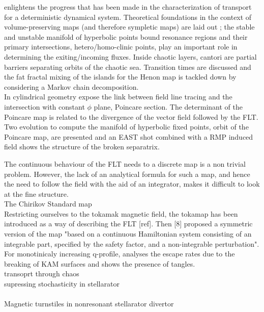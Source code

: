 \cite{meiss_thirty_2015} enlightens the progress that has been made in the characterization of transport for a deterministic dynamical system. Theoretical foundations in the context of volume-preserving maps (and therefore sympletic maps) are laid out ; the stable and unstable manifold of hyperbolic points bound resonance regions and their primary intersections, hetero/homo-clinic points, play an important role in determining the exiting/incoming fluxes. Inside chaotic layers, cantori are partial barriers separating orbits of the chaotic sea. Transition times are discussed and the fat fractal mixing of the islands for the Henon map is tackled down by considering a Markov chain decomposition.
\\[10pt]
In cylindrical geometry \cite{wei_invariant_2023} expose the link between field line tracing and the intersection with constant $\phi$ plane, Poincare section. The determinant of the Poincare map is related to the divergence of the vector field followed by the FLT. Two evolution to compute the manifold of hyperbolic fixed points, orbit of the Poincare map, are presented and an EAST shot combined with a RMP induced field shows the structure of the broken separatrix.

The continuous behaviour of the FLT needs to a discrete map is a non trivial problem.
However, the lack of an analytical formula for such a map, and hence the need to follow the field with the aid of an integrator, makes it difficult to look at the fine structure.
\\[10pt]
The Chirikov Standard map  
\\[10pt]
Restricting ourselves to the tokamak magnetic field, the tokamap has been introduced as a way of describing the FLT [ref]. Then [8] proposed a symmetric version of the map "based on a continuous Hamiltonian system consisting of an integrable part, specified by the safety factor, and a non-integrable perturbation". For monotinicaly increasing q-profile, \cite{wingen_stochastic_2005} analyses the escape rates due to the breaking of KAM surfaces and shows the presence of tangles. 
\\[10pt]
transoprt through chaos \cite{easton_transport_1991}
\\[10pt]
supressing stochasticity in stellarator \cite{hanson_elimination_1984}
\\[10pt]

\\[10pt]
Magnetic turnstiles in nonresonant stellarator divertor
\\[10pt]

